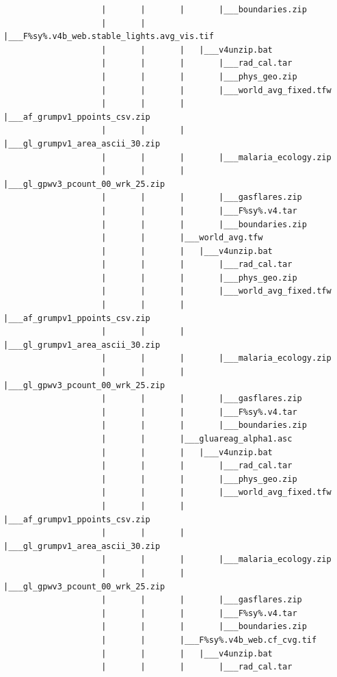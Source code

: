 \documentclass[]{book}
\begin{document}
\begin{verbatim}
                    |       |       |       |___boundaries.zip
                    |       |       |___F%sy%.v4b_web.stable_lights.avg_vis.tif
                    |       |       |   |___v4unzip.bat
                    |       |       |       |___rad_cal.tar
                    |       |       |       |___phys_geo.zip
                    |       |       |       |___world_avg_fixed.tfw
                    |       |       |       |___af_grumpv1_ppoints_csv.zip
                    |       |       |       |___gl_grumpv1_area_ascii_30.zip
                    |       |       |       |___malaria_ecology.zip
                    |       |       |       |___gl_gpwv3_pcount_00_wrk_25.zip
                    |       |       |       |___gasflares.zip
                    |       |       |       |___F%sy%.v4.tar
                    |       |       |       |___boundaries.zip
                    |       |       |___world_avg.tfw
                    |       |       |   |___v4unzip.bat
                    |       |       |       |___rad_cal.tar
                    |       |       |       |___phys_geo.zip
                    |       |       |       |___world_avg_fixed.tfw
                    |       |       |       |___af_grumpv1_ppoints_csv.zip
                    |       |       |       |___gl_grumpv1_area_ascii_30.zip
                    |       |       |       |___malaria_ecology.zip
                    |       |       |       |___gl_gpwv3_pcount_00_wrk_25.zip
                    |       |       |       |___gasflares.zip
                    |       |       |       |___F%sy%.v4.tar
                    |       |       |       |___boundaries.zip
                    |       |       |___gluareag_alpha1.asc
                    |       |       |   |___v4unzip.bat
                    |       |       |       |___rad_cal.tar
                    |       |       |       |___phys_geo.zip
                    |       |       |       |___world_avg_fixed.tfw
                    |       |       |       |___af_grumpv1_ppoints_csv.zip
                    |       |       |       |___gl_grumpv1_area_ascii_30.zip
                    |       |       |       |___malaria_ecology.zip
                    |       |       |       |___gl_gpwv3_pcount_00_wrk_25.zip
                    |       |       |       |___gasflares.zip
                    |       |       |       |___F%sy%.v4.tar
                    |       |       |       |___boundaries.zip
                    |       |       |___F%sy%.v4b_web.cf_cvg.tif
                    |       |       |   |___v4unzip.bat
                    |       |       |       |___rad_cal.tar

\end{verbatim}
\end{document}
